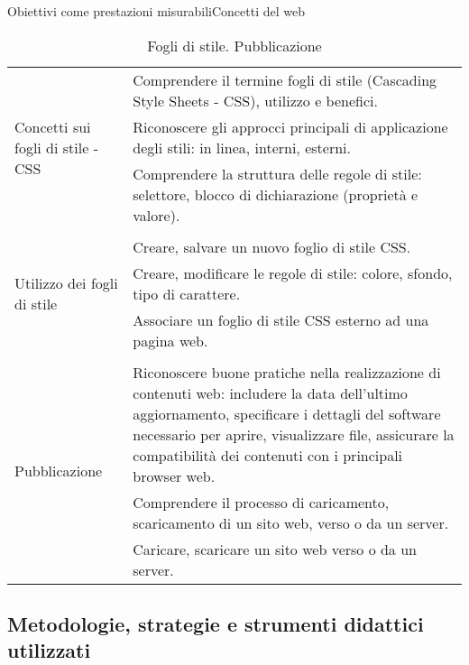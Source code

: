\documentclass[italian]{beamer}
\begin{document}
\begin{frame}[allowframebreaks]{Obiettivi come prestazioni misurabili}{Concetti del web}
{\begin{table}
\begin{tabular}{@{}p{}p{}@{}}
				\multirow{3}{*}{\parbox{0.2\textwidth}{Concetti sui fogli
						di stile - CSS}}
				& Comprendere il termine fogli di stile (Cascading
				Style Sheets - CSS), utilizzo e benefici.\\
				& Riconoscere gli approcci principali di applicazione
				degli stili: in linea, interni, esterni.\\ 
				& Comprendere la struttura delle regole di stile:
				selettore, blocco di dichiarazione (propriet\`a e
				valore).\\
				
				\\
				
				\multirow{3}{*}{\parbox{0.2\textwidth}{Utilizzo dei fogli di
						stile}}
				& Creare, salvare un nuovo foglio di stile CSS.\\
				& Creare, modificare le regole di stile: colore, sfondo,
				tipo di carattere.\\
				& Associare un foglio di stile CSS esterno ad una
				pagina web.\\
				
				\\
				
				\multirow{3}{*}{\parbox{0.2\textwidth}{Pubblicazione}}
				& Riconoscere buone pratiche nella realizzazione di
				contenuti web: includere la data dell'ultimo
				aggiornamento, specificare i dettagli del software
				necessario per aprire, visualizzare file, assicurare la
				compatibilit\`a dei contenuti con i principali browser
				web.\\
				& Comprendere il processo di caricamento,
				scaricamento di un sito web, verso o da un server.\\
				& Caricare, scaricare un sito web verso o da un
				server.
				\\ \bottomrule
			\end{tabular}
			\caption{Fogli di stile. Pubblicazione}
		\end{table}
	}
	
\end{frame}

\subsection[Strategie\ldots]{Metodologie, strategie e strumenti didattici utilizzati}
\end{document}
